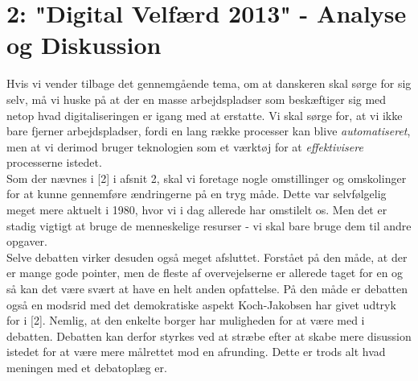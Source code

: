 \documentclass[12pt]{article}
\begin{document}
\section*{2: "Digital Velfærd 2013" - Analyse og Diskussion}
Hvis vi vender tilbage det gennemgående tema, om at danskeren skal sørge for sig selv, må vi huske på at der en masse arbejdspladser som beskæftiger sig med netop hvad digitaliseringen er igang med at erstatte. Vi skal sørge for, at vi ikke bare fjerner arbejdspladser, fordi en lang række processer kan blive \textit{automatiseret}, men at vi derimod bruger teknologien som et værktøj for at \textit{effektivisere} processerne istedet. \\
Som der nævnes i [2] i afsnit 2, skal vi foretage nogle omstillinger og omskolinger for at kunne gennemføre ændringerne på en tryg måde. Dette var selvfølgelig meget mere aktuelt i 1980, hvor vi i dag allerede har omstilelt os. Men det er stadig vigtigt at bruge de menneskelige resurser - vi skal bare bruge dem til andre opgaver.\\
Selve debatten virker desuden også meget afsluttet. Forstået på den måde, at der er mange gode pointer, men de fleste af overvejelserne er allerede taget for en og så kan det være svært at have en helt anden opfattelse. På den måde er debatten også en modsrid med det demokratiske aspekt Koch-Jakobsen har givet udtryk for i [2]. Nemlig, at den enkelte borger har muligheden for at være med i debatten. Debatten kan derfor styrkes ved at stræbe efter at skabe mere disussion istedet for at være mere målrettet mod en afrunding. Dette er trods alt hvad meningen med et debatoplæg er.
\end{document}
